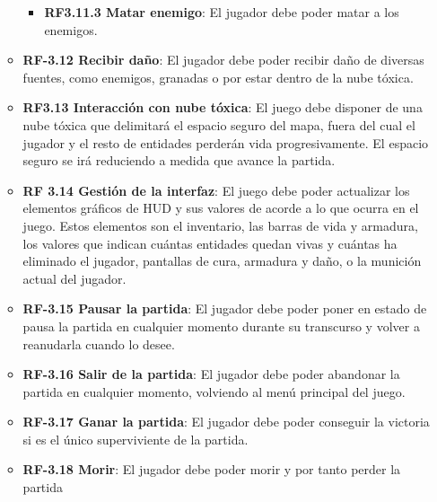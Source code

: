 \begin{itemize}
\begin{itemize}
\begin{itemize}
            \item \textbf{RF3.11.3 Matar enemigo}: El jugador debe poder matar a los enemigos.
        \end{itemize}
        \item \textbf{RF-3.12 Recibir daño}: El jugador debe poder recibir daño de diversas fuentes, como enemigos, granadas o por estar dentro de la nube tóxica.
        \item \textbf{RF3.13 Interacción con nube tóxica}: El juego debe disponer de una nube tóxica que delimitará el espacio seguro del mapa, fuera del cual el jugador y el resto de entidades perderán vida progresivamente. El espacio seguro se irá reduciendo a medida que avance la partida.
        \item \textbf{RF 3.14 Gestión de la interfaz}: El juego debe poder actualizar los elementos gráficos de HUD y sus valores de acorde a lo que ocurra en el juego. Estos elementos son el inventario, las barras de vida y armadura, los valores que indican cuántas entidades quedan vivas y cuántas ha eliminado el jugador, pantallas de cura, armadura y daño, o la munición actual del jugador.
        \item \textbf{RF-3.15 Pausar la partida}: El jugador debe poder poner en estado de pausa la partida en cualquier momento durante su transcurso y volver a reanudarla cuando lo desee.
        \item \textbf{RF-3.16 Salir de la partida}: El jugador debe poder abandonar la partida en cualquier momento, volviendo al menú principal del juego.
        \item \textbf{RF-3.17 Ganar la partida}: El jugador debe poder conseguir la victoria si es el único superviviente de la partida. 
        \item \textbf{RF-3.18 Morir}: El jugador debe poder morir y por tanto perder la partida
    \end{itemize}
\end{itemize}

